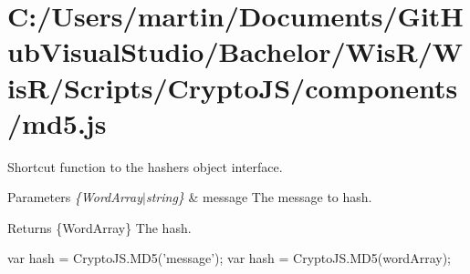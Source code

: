 \hypertarget{_c_1_2_users_2martin_2_documents_2_git_hub_visual_studio_2_bachelor_2_wis_r_2_wis_r_2_scripts_2_f711bcf880480968d4e4e4c00b21e685}{}\section{C\+:/\+Users/martin/\+Documents/\+Git\+Hub\+Visual\+Studio/\+Bachelor/\+Wis\+R/\+Wis\+R/\+Scripts/\+Crypto\+J\+S/components/md5.\+js}
Shortcut function to the hasher\textquotesingle{}s object interface.


\begin{DoxyParams}{Parameters}
{\em \{\+Word\+Array$\vert$string\}} & message The message to hash.\\
\hline
\end{DoxyParams}
\begin{DoxyReturn}{Returns}
\{Word\+Array\} The hash.
\end{DoxyReturn}
\begin{DoxyVerb}var hash = CryptoJS.MD5('message');
var hash = CryptoJS.MD5(wordArray);\end{DoxyVerb}



